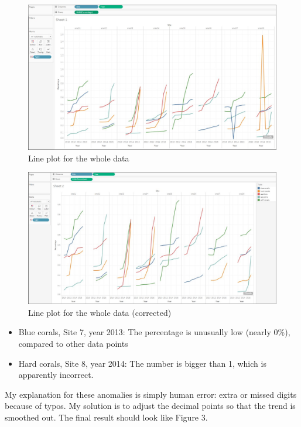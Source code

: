 \documentclass[a4paper,12pt,twoside]{article}
\begin{document}
\begin{figure}[h]
\caption{Line plot for the whole data}
\includegraphics[width=14.5cm]{img/e2.jpg}
\end{figure}
\begin{figure}[!]
\caption{Line plot for the whole data (corrected)}
\includegraphics[width=14.5cm]{img/e22.jpg}
\end{figure}

\begin{itemize}
\item Blue corals, Site 7, year 2013: The percentage is unusually low (nearly 0\%), compared to other data points
\item Hard corals, Site 8, year 2014: The number is bigger than 1, which is apparently incorrect.
\end{itemize}

My explanation for these anomalies is simply human error: extra or missed digits because of typos. My solution is to adjust the decimal points so that the trend is smoothed out. The final result should look like Figure 3.
\end{document}
